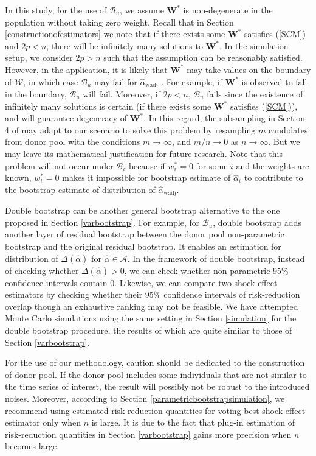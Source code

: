 \documentclass[11pt]{article}
\def\mrm#1{\mathrm{#1}} %
\def\mc#1{\mathcal{#1}} %
\theoremstyle{definition}
\begin{document}
In this study, for the use of $\mc{B}_u$, we assume $\mathbf{W}^*$ is non-degenerate in the population without taking zero weight.  Recall that in Section \ref{constructionofestimators} we note that if there exists some $\mathbf{W}^*$ satisfies (\ref{SCM}) and $2p < n$, there will be infinitely many solutions to $\mathbf{W}^*$. In the simulation setup, we consider $2p >n$ such that the assumption can be reasonably satisfied. However, in the application, it is likely that $\mathbf{W}^*$ may  take values on the boundary of $\mc{W}$, in which case $\mc{B}_u$ may fail for $\hat{\alpha}_{\mrm{wadj}}$ \citep{andrews2000inconsistency}. For example, if $\mathbf{W}^*$ is observed to fall in the boundary, $\mc{B}_u$ will fail.  Moreover, if $2p < n$, $\mc{B}_u$ fails since the existence of infinitely many solutions is certain (if there exists some $\mathbf{W}^*$ satisfies (\ref{SCM})), and will guarantee degeneracy of  $\mathbf{W}^*$. In this regard, the subsampling in Section 4 of \citet{li2019statistical} may adapt to our scenario to solve this problem by resampling $m$ candidates from donor pool with the conditions $m \to \infty$, and $m/n \to 0$ as $n \to \infty$. But we may leave its mathematical justification for future research. Note that this problem will not occur under  $\mc{B}_c$ because  if $w_i^*=0$ for some $i$ and the weights are known, $w_i^*=0$ makes it impossible for bootstrap estimate of $\hat{\alpha}_i$ to contribute to the bootstrap estimate of distribution of $\hat{\alpha}_{\mrm{wadj}}$. 


Double bootstrap can be another general bootstrap alternative to the one proposed in Section \ref{varbootstrap}. For example, for $\mc{B}_u$, double bootstrap adds another layer of residual bootstrap between the donor pool non-parametric bootstrap and the original residual bootstrap. It enables an estimation for distribution of $\Delta(\hat{\alpha})$ for $\hat{\alpha} \in \mc{A}$. In the framework of double bootstrap, instead of checking whether $\Delta(\hat{\alpha})>0$, we can check whether non-parametric 95\% confidence intervals contain 0. Likewise, we can compare two shock-effect estimators by checking whether their 95\% confidence intervals of risk-reduction overlap though an exhaustive ranking may not be feasible. We have attempted Monte Carlo simulations using the same setting in Section \ref{simulation} for the double bootstrap procedure, the results of which are quite similar to those of Section \ref{varbootstrap}.

For the use of our methodology, caution should be dedicated to the construction of donor pool. If the donor pool includes some individuals that are not similar to the time series of interest, the result will possibly not be robust to the introduced noises.   Moreover, according to Section \ref{parametricbootstrapsimulation}, we recommend using estimated risk-reduction quantities for voting best shock-effect estimator only when $n$ is large. It is  due to the fact that plug-in estimation of  risk-reduction quantities in Section \ref{varbootstrap} gains more precision when $n$ becomes large.
\end{document}
